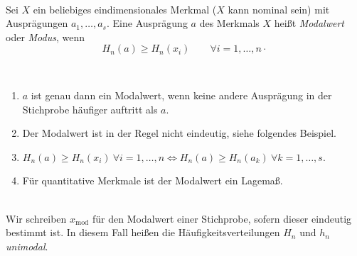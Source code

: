 \begin{defi}
     \\
    Sei $X$ ein beliebiges eindimensionales \gls{Merkmal} ($X$ kann nominal sein) mit Ausprägungen $a_1,\dots,a_s$.
    Eine Ausprägung $a$ des \gls{Merkmal}s $X$ heißt \emph{Modalwert} oder \emph{Modus}, wenn
    \[
        H_n(a) \geq H_n(x_i) \qquad \forall i=1,\dots,n \cdot
    \]
\end{defi}

\begin{bem}
     \\
    \begin{enumerate}[label=(\alph*)]
        \item $a$ ist genau dann ein Modalwert, wenn keine andere Ausprägung in der Stichprobe häufiger auftritt als $a$.
        \item Der Modalwert ist in der Regel nicht eindeutig, siehe folgendes Beispiel.
        \item $H_n(a)\geq H_n(x_i)\ \forall i=1,\dots,n \iff H_n(a)\geq H_n(a_k)\ \forall k=1,\dots,s$.
        \item Für quantitative \gls{Merkmal}e ist der Modalwert ein \gls{Lagemaß}.
    \end{enumerate}
\end{bem}

\begin{defi}[Unimodal]
     \\
    Wir schreiben $x_{\mathrm{mod}}$ für den Modalwert einer Stichprobe, sofern dieser eindeutig bestimmt ist.
    In diesem Fall heißen die Häufigkeitsverteilungen $H_n$ und $h_n$ \emph{unimodal}.

\end{defi}

